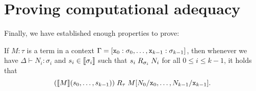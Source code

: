 \section{Proving computational adequacy}

Finally, we have established enough properties to prove:
\begin{lemma}\label{fundamental-theorem}
  If \(M : \tau\) is a term in a context
  \(\Gamma = [\mathtt x_0 : \sigma_0 , \dots , \mathtt x_{k-1} : \sigma_{k-1}]\), then
  whenever we have \(\Delta \vdash N_i : \sigma_i\) and
  \(s_i \in \llbracket\sigma_i\rrbracket\) such that \(s_i \mathrel{R}_{\sigma_i} N_i\) for all
  \(0 \leq i \leq k-1\), it holds that
  \[
    \pa*{\densem{M}\pa*{s_0,\dots,s_{k-1}}} \logrel_{\tau} {M[N_0/\var x_0,\dots,N_{k-1}/\var x_{k-1}]}.
  \]
\end{lemma}

